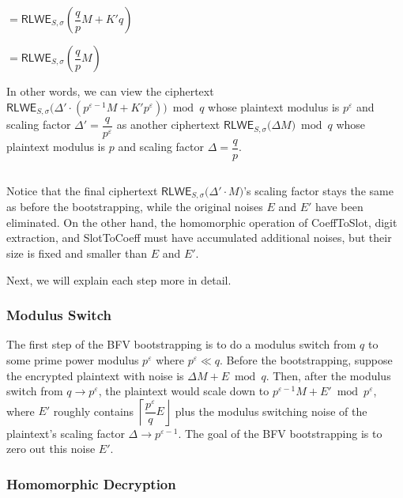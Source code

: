 \begin{enumerate}
$ = \textsf{RLWE}_{S, \sigma}\left(\dfrac{q}{p}M + K'q \right)$

$ = \textsf{RLWE}_{S, \sigma}\left(\dfrac{q}{p}M \right)$


In other words, we can view the ciphertext $ \textsf{RLWE}_{S, \sigma}\bm(\Delta' \cdot (p^{\varepsilon-1} M + K'p^\varepsilon )\bm) \bmod q$ whose plaintext modulus is $p^\varepsilon$ and scaling factor $\Delta' = \dfrac{q}{p^\varepsilon}$ as another ciphertext $ \textsf{RLWE}_{S, \sigma}\bm(\Delta M \bm) \bmod q$ whose plaintext modulus is $p$ and scaling factor $\Delta = \dfrac{q}{p}$. 




\end{enumerate}

$ $

Notice that the final ciphertext $ \textsf{RLWE}_{S, \sigma}\bm(\Delta' \cdot M \bm)$'s scaling factor stays the same as before the bootstrapping, while the original noises $E$ and $E'$ have been eliminated. On the other hand, the homomorphic operation of \textsf{CoeffToSlot}, digit extraction, and \textsf{SlotToCoeff} must have accumulated additional noises, but their size is fixed and smaller than $E$ and $E'$. 

Next, we will explain each step more in detail. 

\subsubsection{Modulus Switch}
\label{subsubsec:bfv-bootstrapping-modulus-switch}

The first step of the BFV bootstrapping is to do a modulus switch from $q$ to some prime power modulus $p^\varepsilon$ where $p^\varepsilon \ll q$. Before the bootstrapping, suppose the encrypted plaintext with noise is $\Delta M + E \bmod q$. Then, after the modulus switch from $q \rightarrow p^\varepsilon$, the plaintext would scale down to $p^{\varepsilon-1}M + E' \bmod p^\varepsilon$, where $E'$ roughly contains $\left\lceil\dfrac{p^\varepsilon}{q} E\right\rfloor$ plus the modulus switching noise of the plaintext's scaling factor $\Delta \rightarrow p^{\varepsilon-1}$. The goal of the BFV bootstrapping is to zero out this noise $E'$.  

\subsubsection{Homomorphic Decryption}
\label{subsubsec:bfv-bootstrapping-homomorphic-decryption}

